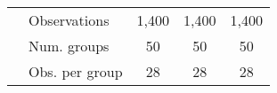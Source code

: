 \begin{tabular}{l|lccc}
& Observations & 1,400 & 1,400 & 1,400 \\ 

& Num. groups  & 50 & 50 & 50 \\ 

& Obs. per group  &28&28&28\\ 
\end{tabular} 
